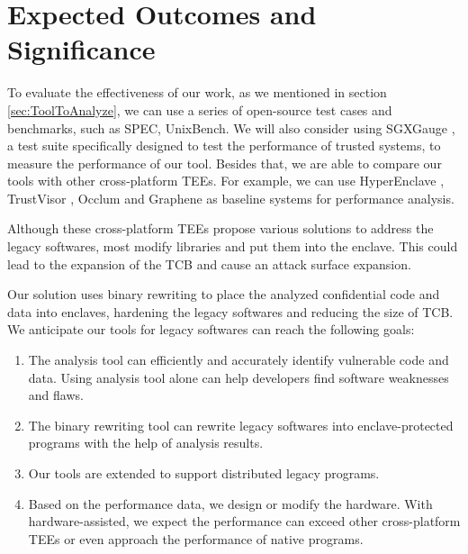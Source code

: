 \section{Expected Outcomes and Significance}
To evaluate the effectiveness of our work, as we mentioned in section
\ref{sec:ToolToAnalyze}, we can use a series of open-source test cases and benchmarks,
such as SPEC, UnixBench. 
We will also consider using SGXGauge \cite{Kumar2022ACB}, a test suite specifically
designed to test the performance of trusted systems, to measure the performance
of our tool.
Besides that, we are able to compare our tools with other cross-platform TEEs.
For example, we can use HyperEnclave \cite{Jia2022HyperEnclaveAO}, TrustVisor
\cite{McCune2010TrustVisorET}, Occlum \cite{Shen2020OcclumSA} and Graphene
\cite{Tsai2017GrapheneSGXAP} as baseline systems for performance analysis.

Although these cross-platform TEEs propose various solutions to address the
legacy softwares, most modify libraries and put them into the enclave.
This could lead to the expansion of the TCB and cause  an attack surface expansion.

Our solution uses binary rewriting to place the analyzed confidential code and data
into enclaves, hardening the legacy softwares and reducing the size of TCB.
We anticipate our tools for legacy softwares can reach the following goals:
\begin{enumerate}
    \item The analysis tool can efficiently and accurately identify vulnerable code and data.
    Using analysis tool alone can help developers find software weaknesses and flaws.
    \item The binary rewriting tool can rewrite legacy softwares into enclave-protected programs
    with the help of analysis results.
    \item Our tools are extended to support distributed legacy programs.
    \item Based on the performance data, we design or modify the hardware.
    With hardware-assisted, we expect the performance can exceed other cross-platform TEEs
    or even approach the performance of native programs.
\end{enumerate}